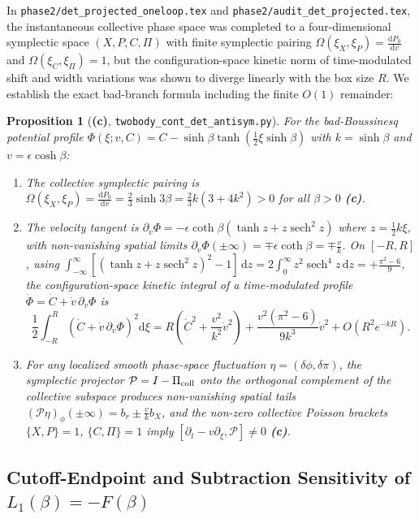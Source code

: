 \documentclass[11pt,a4paper]{article}
\newcommand{\Lc}{\textbf{(c)}}
\newcommand{\script}[1]{\texttt{#1}}
\newcommand{\dd}{\mathrm{d}}
\newtheorem{proposition}{Proposition}[section]
\begin{document}
In \texttt{phase2/det\_projected\_oneloop.tex} and \texttt{phase2/audit\_det\_projected.tex}, the instantaneous collective phase space was completed to a four-dimensional symplectic space $(X,P,C,\Pi)$ with finite symplectic pairing $\Omega(\xi_X,\xi_P)=\frac{\dd P_0}{\dd v}$ and $\Omega(\xi_C,\xi_\Pi)=1$, but the configuration-space kinetic norm of time-modulated shift and width variations was shown to diverge linearly with the box size $R$. We establish the exact bad-branch formula including the finite $O(1)$ remainder:

\begin{proposition}[\Lc, \script{twobody\_cont\_det\_antisym.py}]\label{prop:kinetic_norm}
For the bad-Boussinesq potential profile $\Phi(\xi;v,C)=C-\sinh\beta\tanh(\frac12\xi\sinh\beta)$ with $k=\sinh\beta$ and $v=\epsilon\cosh\beta$:
\begin{enumerate}
\item The collective symplectic pairing is $\Omega(\xi_X,\xi_P)=\frac{\dd P_0}{\dd v}=\frac23\sinh 3\beta=\frac23 k(3+4k^2)>0$ for all $\beta>0$ \Lc.
\item The velocity tangent is $\partial_v\Phi=-\epsilon\coth\beta\left(\tanh z+z\operatorname{sech}^2 z\right)$ where $z=\frac12 k\xi$, with non-vanishing spatial limits $\partial_v\Phi(\pm\infty)=\mp\epsilon\coth\beta=\mp\frac{v}{k}$. On $[-R,R]$, using $\int_{-\infty}^\infty[(\tanh z+z\operatorname{sech}^2 z)^2-1]\,\dd z=2\int_0^\infty z^2\operatorname{sech}^4 z\,\dd z=+\frac{\pi^2-6}{9}$, the configuration-space kinetic integral of a time-modulated profile $\dot\Phi=\dot C+\dot v\,\partial_v\Phi$ is
\begin{equation}\label{eq:bad_kinetic_norm}
\frac12\int_{-R}^R\left(\dot C+\dot v\,\partial_v\Phi\right)^2\dd\xi
=R\left(\dot C^2+\frac{v^2}{k^2}\dot v^2\right)+\frac{v^2(\pi^2-6)}{9k^3}\dot v^2+O\!\left(R^2 e^{-kR}\right).
\end{equation}
\item For any localized smooth phase-space fluctuation $\eta=(\delta\phi,\delta\pi)$, the symplectic projector $\mathcal{P}=I-\Pi_{\rm coll}$ onto the orthogonal complement of the collective subspace produces non-vanishing spatial tails $(\mathcal{P}\eta)_\phi(\pm\infty)=b_r\pm\frac{v}{k}b_X$, and the non-zero collective Poisson brackets $\{X,P\}=1$, $\{C,\Pi\}=1$ imply $[\partial_t-v\partial_\xi,\mathcal{P}]\neq 0$ \Lc.
\end{enumerate}
\end{proposition}

\subsection{Cutoff-Endpoint and Subtraction Sensitivity of $L_1(\beta)=-F(\beta)$}
\end{document}
